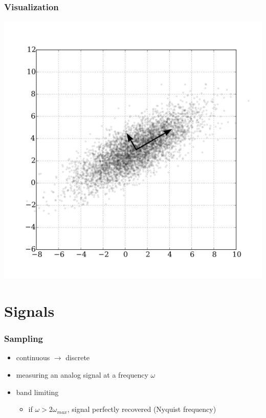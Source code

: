 \documentclass[aspectratio=169]{beamer}
\begin{document}
\begin{frame}
    \frametitle{Visualization}

    \centering
    \includegraphics[height=0.9\textheight]{1024px-GaussianScatterPCA.svg.png}
\end{frame}

\section{Signals}

\begin{frame}
    \frametitle{Sampling}

    \begin{itemize}
        \item continuous \(\to\) discrete
        \item measuring an analog signal at a frequency \(\omega\)
        \item band limiting \begin{itemize}
            \item if \(\omega > 2 \omega_{max}\), signal perfectly recovered (Nyquist frequency)
        \end{itemize}
    \end{itemize}
\end{frame}
\end{document}
